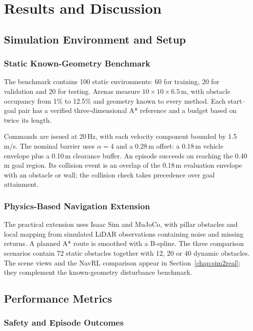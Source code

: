 \chapter{Results and Discussion}
\label{chap:results}

\section{Simulation Environment and Setup}
\label{sec:simulation_setup}
\subsection{Static Known-Geometry Benchmark}
The benchmark contains 100 static environments: 60 for training, 20 for validation and 20 for testing. Arenas measure $10\times10\times6.5$\,m, with obstacle occupancy from 1\% to 12.5\% and geometry known to every method. Each start--goal pair has a verified three-dimensional A* reference and a budget based on twice its length.

Commands are issued at 20\,Hz, with each velocity component bounded by 1.5\,m/s. The nominal barrier uses $\alpha=4$ and a 0.28\,m offset: a 0.18\,m vehicle envelope plus a 0.10\,m clearance buffer. An episode succeeds on reaching the 0.40\,m goal region. Its collision event is an overlap of the 0.18\,m evaluation envelope with an obstacle or wall; the collision check takes precedence over goal attainment.

\subsection{Physics-Based Navigation Extension}
The practical extension uses Isaac Sim and MuJoCo, with pillar obstacles and local mapping from simulated LiDAR observations containing noise and missing returns. A planned A* route is smoothed with a B-spline. The three comparison scenarios contain 72 static obstacles together with 12, 20 or 40 dynamic obstacles. The scene views and the NavRL comparison appear in Section~\ref{chap:sim2real}; they complement the known-geometry disturbance benchmark.

\clearpage
\section{Performance Metrics}
\label{sec:performance_metrics}

\subsection{Safety and Episode Outcomes}

